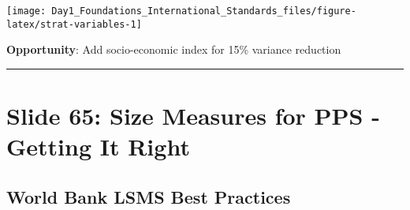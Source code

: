\documentclass[
]{article}
\begin{document}
\texttt{[image: Day1\_Foundations\_International\_Standards\_files/figure-latex/strat-variables-1]}

\textbf{Opportunity}: Add socio-economic index for 15\% variance
reduction

\begin{center}\rule{0.5\linewidth}{0.5pt}\end{center}

\section{Slide 65: Size Measures for PPS - Getting It
Right}\label{slide-65-size-measures-for-pps---getting-it-right}

\subsection{World Bank LSMS Best
Practices}\label{world-bank-lsms-best-practices}
\end{document}

